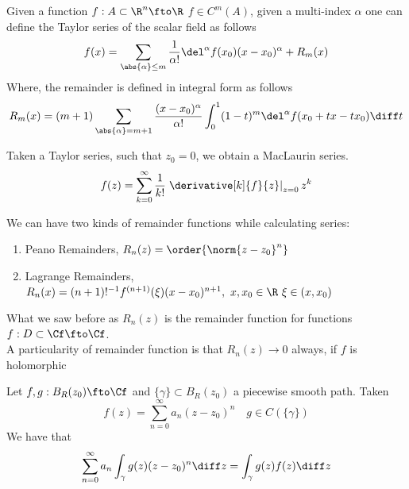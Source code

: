 \documentclass[../mmf.tex]{subfiles}
\begin{document}
\begin{dfn}
	Given a function $f:A\subset\R^n\fto\R$ $f\in C^m(A)$, given a multi-index $\alpha$ one can define the Taylor series of the scalar field as follows
	\begin{equation*}
		f(x)=\sum_{\abs{\alpha}\le m}\frac{1}{\alpha!}\del^\alpha f(x_0)(x-x_0)^\alpha+R_m(x)
	\end{equation*}
	Where, the remainder is defined in integral form as follows
	\begin{equation*}
		R_m(x)=(m+1)\sum_{\abs{\alpha}=m+1}^{}\frac{(x-x_0)^\alpha}{\alpha!}\int_{0}^{1}(1-t)^m\del^\alpha f(x_0+tx-tx_0)\diff t
	\end{equation*}
\end{dfn}
\begin{dfn}
	Taken a Taylor series, such that $z_0=0$, we obtain a MacLaurin series.
	\begin{equation}
		f(z)=\sum_{k=0}^\infty\frac{1}{k!}\left.\derivative[k]{f}{z}\right|_{z=0}z^k
		\label{eq:maclaurinseries}
	\end{equation}
\end{dfn}
\begin{dfn}[Remainders]
	We can have two kinds of remainder functions while calculating series:
	\begin{enumerate}
	\item Peano Remainders, $R_n(z)=\order{\norm{z-z_0}^n}$
	\item Lagrange Remainders, $R_n(x)=(n+1)!^{-1}f^{(n+1)}(\xi)(x-x_0)^{n+1},\ x,x_0\in\R\ \xi\in(x,x_0)$
	\end{enumerate}
	What we saw before as $R_n(z)$ is the remainder function for functions $f:D\subset\Cf\fto\Cf$.\\
	A particularity of remainder function is that $R_n(z)\to0$ always, if $f$ is holomorphic
\end{dfn}
\begin{thm}
	Let $f,g:B_R(z_0)\fto\Cf$ and $\{\gamma\}\subset B_R(z_0)$ a piecewise smooth path. Taken
	\begin{equation*}
		f(z)=\sum_{n=0}^\infty a_n(z-z_0)^n\quad g\in C(\{\gamma\})
	\end{equation*}
	We have that
	\begin{equation}
		\sum_{n=0}^{\infty}a_n\int_{\gamma}^{}g(z)(z-z_0)^n\diff z=\int_{\gamma}^{}g(z)f(z)\diff z
		\label{eq:integralps2}
	\end{equation}
\end{thm}
\end{document}
